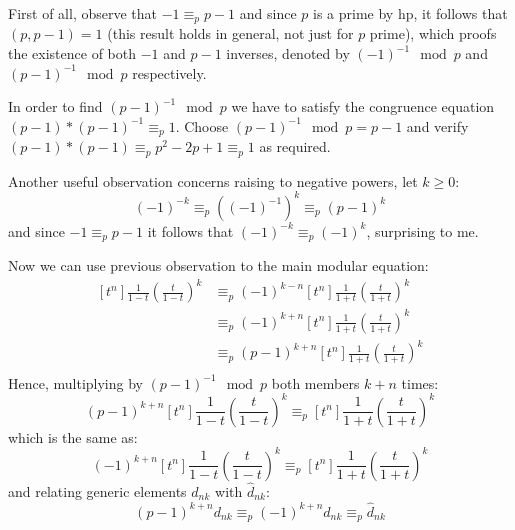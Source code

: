 \documentclass[11pt,a4paper]{article} %
\begin{document}
    First of all, observe that $-1 \equiv_{p} p-1$ and since $p$ is a
    prime by hp, it follows that $(p, p-1)=1$ (this result holds in
    general, not just for $p$ prime), which proofs the existence of
    both $-1$ and $p-1$ inverses, denoted by $(-1)^{-1}\mod p$ and
    $(p-1)^{-1}\mod p$ respectively.

    In order to find $(p-1)^{-1}\mod p$ we have to satisfy the
    congruence equation $(p-1) * (p-1)^{-1} \equiv_{p} 1$. Choose
    $(p-1)^{-1}\mod p = p-1$ and verify
    $(p-1) * (p-1) \equiv_{p} p^2 -2p +1 \equiv_{p} 1$ as required.

    Another useful observation concerns raising to negative powers,
    let $k \geq 0$:
    \begin{displaymath}
        (-1)^{-k} \equiv_{p} \left((-1)^{-1}\right)^{k} \equiv_{p} (p-1)^k
    \end{displaymath}
    and since $-1 \equiv_{p} p-1$ it follows that
    $(-1)^{-k} \equiv_{p} (-1)^k$, surprising to me.
    
    Now we can use previous observation to the main modular equation:
    \begin{displaymath}
        \begin{split}
            [t^n]\frac{1}{1-t}\left(\frac{t}{1-t}\right)^k 
                &\equiv_{p} (-1)^{k-n}[t^n]\frac{1}{1+t}\left(\frac{t}{1+t}\right)^k \\
                &\equiv_{p} (-1)^{k+n}[t^n]\frac{1}{1+t}\left(\frac{t}{1+t}\right)^k \\
                &\equiv_{p} (p-1)^{k+n}[t^n]\frac{1}{1+t}\left(\frac{t}{1+t}\right)^k \\
        \end{split}
    \end{displaymath}
    Hence, multiplying by $(p-1)^{-1}\mod p$ both members $k+n$ times:
    \begin{displaymath}
        (p-1)^{k+n}[t^n]\frac{1}{1-t}\left(\frac{t}{1-t}\right)^k \equiv_{p} [t^n]\frac{1}{1+t}\left(\frac{t}{1+t}\right)^k 
    \end{displaymath}
    which is the same as:
    \begin{displaymath}
        (-1)^{k+n}[t^n]\frac{1}{1-t}\left(\frac{t}{1-t}\right)^k \equiv_{p} [t^n]\frac{1}{1+t}\left(\frac{t}{1+t}\right)^k 
    \end{displaymath}
    and relating generic elements $d_{nk}$ with $\hat{d}_{nk}$:
    \begin{displaymath}
        (p-1)^{k+n}d_{nk}\equiv_{p}(-1)^{k+n}d_{nk} \equiv_{p} \hat{d}_{nk}
    \end{displaymath}
\end{document}
